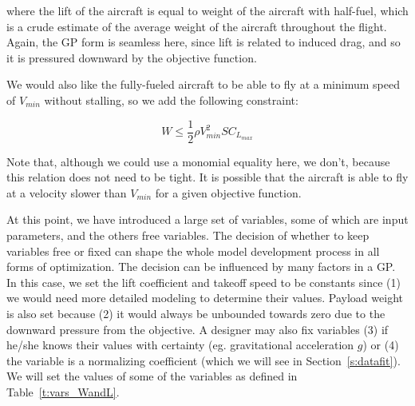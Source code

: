 where the lift of the aircraft is equal to weight of the aircraft with half-fuel, 
which is a crude estimate of the average weight of the aircraft throughout the flight.
Again, the \gls{GP} form is seamless here, since lift is related to
induced drag, and so it is pressured downward by the objective function.

We would also like the fully-fueled aircraft to be able to fly at a minimum speed 
of $V_{min}$ without stalling, so we add the following constraint:

\begin{equation}
    W \leq \frac{1}{2} \rho V_{min}^2 S C_{L_{max}}
\end{equation}

Note that, although we could use a monomial equality here, we don't, because this
relation does not need to be tight. It is possible that the aircraft is able to
fly at a velocity slower than $V_{min}$ for a given objective function.

At this point, we have introduced a large set of variables, some of which are input
parameters, and the others free variables. The decision of whether to keep variables free or fixed
can shape the whole model development process in all forms of optimization.
The decision can be influenced by many
factors in a \gls{GP}. In this case, we set the lift coefficient and takeoff speed
to be constants since (1) we would need
more detailed modeling to determine their values. Payload weight is also set
because (2) it would always be unbounded towards zero due to the downward pressure from
the objective. A designer may also fix variables (3) if he/she knows their values with
certainty (eg. gravitational acceleration $g$) or (4) the variable is a normalizing
coefficient (which we will see in Section~\ref{s:datafit}). We will set the values
of some of the variables as defined in Table~\ref{t:vars_WandL}.

